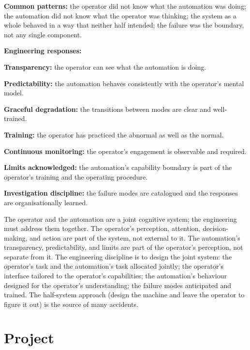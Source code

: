 \textbf{Common patterns:} the operator did not know what the automation was doing; the automation did not know what the operator was thinking; the system as a whole behaved in a way that neither half intended; the failure was the boundary, not any single component.

\textbf{Engineering responses:}

\textbf{Transparency:} the operator can see what the automation is doing.

\textbf{Predictability:} the automation behaves consistently with the operator's mental model.

\textbf{Graceful degradation:} the transitions between modes are clear and well-trained.

\textbf{Training:} the operator has practiced the abnormal as well as the normal.

\textbf{Continuous monitoring:} the operator's engagement is observable and required.

\textbf{Limits acknowledged:} the automation's capability boundary is part of the operator's training and the operating procedure.

\textbf{Investigation discipline:} the failure modes are catalogued and the responses are organisationally learned.

\begin{principle}
The operator and the automation are a joint cognitive system; the engineering must address them together. The operator's perception, attention, decision-making, and action are part of the system, not external to it. The automation's transparency, predictability, and limits are part of the operator's perception, not separate from it. The engineering discipline is to design the joint system: the operator's task and the automation's task allocated jointly; the operator's interface tailored to the operator's capabilities; the automation's behaviour designed for the operator's understanding; the failure modes anticipated and trained. The half-system approach (design the machine and leave the operator to figure it out) is the source of many accidents.
\end{principle}

\section{Project}

